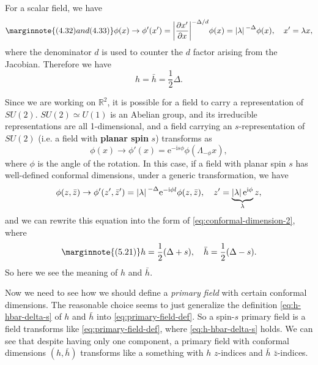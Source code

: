 \documentclass[hyperref, a4paper]{article}
\newcommand*{\ii}{\mathrm{i}}
\newcommand*{\ee}{\mathrm{e}}
\newcommand*{\concept}[1]{{\textbf{#1}}}
\begin{document}
For a scalar field, we have 
\begin{equation} \marginnote{(4.32) and (4.33)}
    \phi(x) \to \phi'(x') = \abs{\pdv{x'}{x}}^{- \Delta / d} \phi(x) = \abs*{\lambda}^{- \Delta} \phi(x), \quad x' = \lambda x, 
\end{equation}
where the denominator $d$ is used to counter the $d$ factor arising from the Jacobian. Therefore we have 
\begin{equation}
    h = \bar{h} = \frac{1}{2} \Delta.
\end{equation}

Since we are working on $\mathbb{R}^2$, it is possible for a field to carry a representation of $SU(2)$.
$SU(2) \simeq U(1)$ is an Abelian group, and its irreducible representations are all 1-dimensional, and 
a field carrying an $s$-representation of $SU(2)$ (i.e. a field with \concept{planar spin} $s$) transforms as 
\begin{equation}
    \phi(x) \to \phi'(x) = \ee^{- \ii s \phi} \phi(\Lambda_{- \phi} x) ,
\end{equation} %
where $\phi$ is the angle of the rotation. In this case, if a field with planar spin $s$ has well-defined conformal 
dimensions, under a generic transformation, we have 
\begin{equation}
    \phi(z, \bar{z}) \to \phi'(z', \bar{z}') = \abs*{\lambda}^{- \Delta} \ee^{- \ii \phi l} \phi(z, \bar{z}), \quad z' = \underbrace{\abs*{\lambda} \ee^{\ii \phi}}_\lambda z,
\end{equation}
and we can rewrite this equation into the form of \eqref{eq:conformal-dimension-2}, where 
\begin{equation} \marginnote{(5.21)}
    h = \frac{1}{2} (\Delta + s), \quad \bar{h} = \frac{1}{2}(\Delta - s).
    \label{eq:h-hbar-delta-s}
\end{equation}
So here we see the meaning of $h$ and $\bar{h}$. 

Now we need to see how we should define a \emph{primary field} with certain conformal dimensions. 
The reasonable choice seems to just generalize the definition \eqref{eq:h-hbar-delta-s} of $h$ and $\bar{h}$ 
into \eqref{eq:primary-field-def}. %
So a spin-$s$ primary field is a field transforms like \eqref{eq:primary-field-def}, where \eqref{eq:h-hbar-delta-s} holds.
We can see that despite having only one component, a primary field with conformal dimensions $(h, \bar{h})$
transforms like a something with $h$ $z$-indices and $\bar{h}$ $\bar{z}$-indices. %



\end{document}
